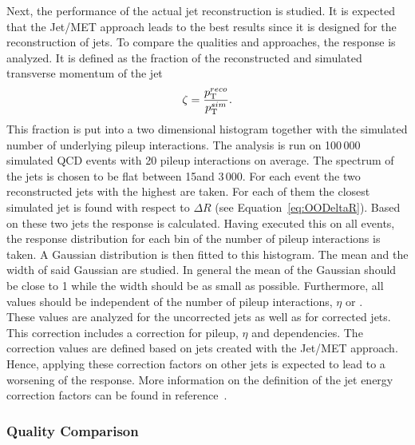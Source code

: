 Next, the performance of the actual jet reconstruction is studied. It is expected that the Jet/MET approach leads to the best results since it is designed for the reconstruction of jets. To compare the qualities and approaches, the \pt{} response is analyzed. It is defined as the fraction of the reconstructed and simulated transverse momentum of the jet
\begin{equation}
\zeta = \frac{p_{\mathrm{T}}^{reco}}{p_{\mathrm{T}}^{sim}}.
\label{eq:OOPtResponse}
\end{equation}
This fraction is put into a two dimensional histogram together with the simulated number of underlying pileup interactions. The analysis is run on 100\,000 simulated QCD events with 20 pileup interactions on average. The spectrum of the jets \pt is chosen to be flat between 15\GeV and 3\,000\GeV{}. For each event the two reconstructed jets with the highest \pt are taken. For each of them the closest simulated jet is found with respect to $\Delta{}R$ (see Equation~\ref{eq:OODeltaR}). Based on these two jets the \pt{} response is calculated. Having executed this on all events, the \pt{} response distribution for each bin of the number of pileup interactions is taken. A Gaussian distribution is then fitted to this histogram. The mean and the width of said Gaussian are studied. In general the mean of the Gaussian should be close to 1 while the width should be as small as possible. Furthermore, all values should be independent of the number of pileup interactions, $\eta$ or \pt{}. \\
These values are analyzed for the uncorrected jets as well as for corrected jets. This correction includes a correction for pileup, $\eta$ and \pt dependencies. The correction values are defined based on jets created with the Jet/MET approach. Hence, applying these correction factors on other jets is expected to lead to a worsening of the \pt{} response. More information on the definition of the jet energy correction factors can be found in reference~.

\subsubsection{Quality Comparison \label{sec:OOJetsPtResponseQuality} }

